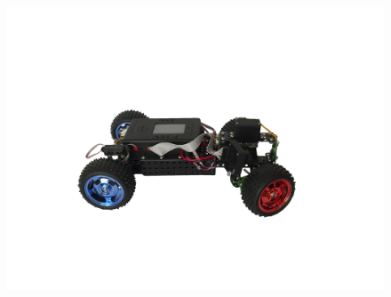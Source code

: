 \documentclass[14pt]{beamer}
\begin{document}
\begin{frame}
\begin{columns}[onlytextwidth]
\begin{column}{0.3\textwidth}
\begin{figure}
\begin{center}
             		\hspace*{0.5cm}\includegraphics[width=\textwidth]{images/presentation/trik2.png}
            	\end{center}
            \end{figure}
        \end{column}
    \end{columns}
\end{frame}
\end{document}
